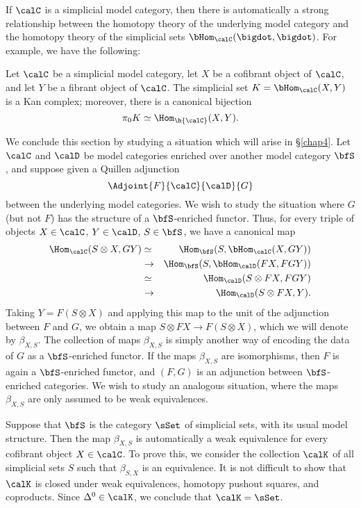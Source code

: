 If $\calC$ is a simplicial model category, then there is automatically a strong relationship between the homotopy theory of the underlying model category and the homotopy theory of the simplicial sets $\bHom_{\calC}(\bigdot, \bigdot)$. For example, we have the following:

\begin{remark}
Let $\calC$ be a simplicial model category, let $X$ be a cofibrant object of $\calC$, and let $Y$ be a fibrant object of $\calC$. The simplicial set $K=\bHom_{\calC}(X,Y)$ is a Kan complex; moreover, 
there is a canonical bijection
$$ \pi_0 K \simeq \Hom_{ \h{ \calC}}(X,Y).$$
\end{remark}

We conclude this section by studying a situation which will arise in \S \ref{chap4}. 
Let $\calC$ and $\calD$ be model categories enriched over another model category $\bfS$, and suppose given a Quillen adjunction $$\Adjoint{F}{\calC}{\calD}{G}$$
between the underlying model categories. We wish to study the situation where $G$ (but not $F$) has the structure of a $\bfS$-enriched functor. Thus, for every triple of objects
$X \in \calC$, $Y \in \calD$, $S \in \bfS$, we have a canonical map
\begin{eqnarray*}
\Hom_{\calC}( S \otimes X, GY) & \simeq & \Hom_{\bfS}( S, \bHom_{\calC}( X, GY) ) \\
& \rightarrow &  \Hom_{\bfS}( S, \bHom_{\calD}(FX, FGY) ) \\
& \simeq & \Hom_{\calD}( S \otimes FX, FGY) \\
& \rightarrow & \Hom_{\calD}( S \otimes FX, Y). \end{eqnarray*}
Taking $Y = F(S \otimes X)$ and applying this map to the unit of the adjunction between
$F$ and $G$, we obtain a map
$S \otimes FX \rightarrow F(S \otimes X)$, which we will denote by $\beta_{X,S}$.
The collection of maps $\beta_{X,S}$ is simply another way of encoding the data of $G$
as a $\bfS$-enriched functor. If the maps $\beta_{X,S}$ are isomorphisms, then
$F$ is again a $\bfS$-enriched functor, and $(F,G)$ is an adjunction between $\bfS$-enriched categories. We wish to study an analogous situation, where the maps $\beta_{X,S}$ are only assumed to be weak equivalences.

\begin{remark}\label{tuccan}
Suppose that $\bfS$ is the category $\sSet$ of simplicial sets, with its usual model structure.
Then the map $\beta_{X,S}$ is automatically a weak equivalence for every cofibrant object
$X \in \calC$. To prove this, we consider the collection $\calK$ of all simplicial sets
$S$ such that $\beta_{S,X}$ is an equivalence. It is not difficult to show that $\calK$ is
closed under weak equivalences, homotopy pushout squares, and coproducts.
Since $\Delta^0 \in \calK$, we conclude that $\calK = \sSet$.
\end{remark}

